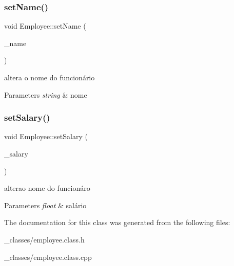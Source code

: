 \subsubsection{\texorpdfstring{set\+Name()}{setName()}}
{\footnotesize\ttfamily void Employee\+::set\+Name (\begin{DoxyParamCaption}\item[{string}]{\+\_\+name }\end{DoxyParamCaption})}



altera o nome do funcionário 


\begin{DoxyParams}{Parameters}
{\em string} & nome \\
\hline
\end{DoxyParams}
\mbox{\label{classEmployee_a7fb79240f7b8ac4321d79a858d079101}} 
\subsubsection{\texorpdfstring{set\+Salary()}{setSalary()}}
{\footnotesize\ttfamily void Employee\+::set\+Salary (\begin{DoxyParamCaption}\item[{float}]{\+\_\+salary }\end{DoxyParamCaption})}



alterao nome do funcionáro 


\begin{DoxyParams}{Parameters}
{\em float} & salário \\
\hline
\end{DoxyParams}


The documentation for this class was generated from the following files\+:\begin{DoxyCompactItemize}
\item 
\+\_\+classes/employee.\+class.\+h\item 
\+\_\+classes/employee.\+class.\+cpp\end{DoxyCompactItemize}
